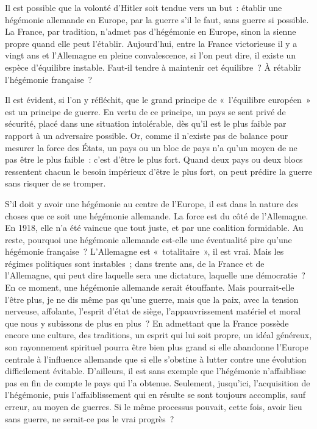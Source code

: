 \documentclass[french,twoside]{book} %
\begin{document}
\noindent Il est possible que la volonté d'Hitler soit tendue vers un but : établir une hégémonie allemande en Europe, par la guerre s'il le faut, sans guerre si possible. La France, par tradition, n'admet pas d'hégémonie en Europe, sinon la sienne propre quand elle peut l'établir. Aujourd'hui, entre la France victo­rieuse il y a vingt ans et l'Allemagne en pleine convalescence, si l'on peut dire, il existe un espèce d'équilibre instable. Faut-il tendre à maintenir cet équilibre ? À rétablir l'hégémonie française ?\par
Il est évident, si l'on y réfléchit, que le grand principe de « l'équilibre européen » est un principe de guerre. En vertu de ce principe, un pays se sent privé de sécurité, placé dans une situation intolérable, dès qu'il est le plus faible par rapport à un adversaire possible. Or, comme il n'existe pas de balance pour mesurer la force des États, un pays ou un bloc de pays n'a qu'un moyen de ne pas être le plus faible : c'est d'être le plus fort. Quand deux pays ou deux blocs ressentent chacun le besoin impérieux d'être le plus fort, on peut prédire la guerre sans risquer de se tromper.\par
S'il doit y avoir une hégémonie au centre de l'Europe, il est dans la nature des choses que ce soit une hégémonie allemande. La force est du côté de l'Allemagne. En 1918, elle n'a été vaincue que tout juste, et par une coalition formidable. Au reste, pourquoi une hégémonie allemande est-elle une éven­tualité pire qu'une hégémonie française ? L'Allemagne est « totalitaire », il est vrai. Mais les régimes politiques sont instables ; dans trente ans, de la France et de l'Allemagne, qui peut dire laquelle sera une dictature, laquelle une démocratie ? En ce moment, une hégémonie allemande serait étouffante. Mais pourrait-elle l'être plus, je ne dis même pas qu'une guerre, mais que la paix, avec la tension nerveuse, affolante, l'esprit d'état de siège, l'appauvrissement matériel et moral que nous y subissons de plus en plus ? En admettant que la France possède encore une culture, des traditions, un esprit qui lui soit propre, un idéal généreux, son rayonnement spirituel pourra être bien plus grand si elle abandonne l'Europe centrale à l'influence allemande que si elle s'obstine à lutter contre une évolution difficilement évitable. D'ailleurs, il est sans exemple que l'hégémonie n'affaiblisse pas en fin de compte le pays qui l'a obtenue. Seulement, jusqu'ici, l'acquisition de l'hégémonie, puis l'affaiblisse­ment qui en résulte se sont toujours accomplis, sauf erreur, au moyen de guerres. Si le même processus pouvait, cette fois, avoir lieu sans guerre, ne serait-ce pas le vrai progrès ?\par
\end{document}
